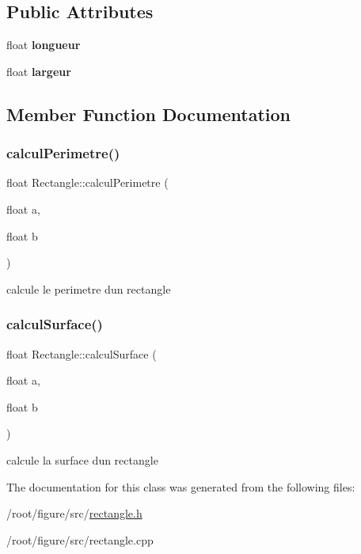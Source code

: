 \subsection*{Public Attributes}
\begin{DoxyCompactItemize}
\item 
\mbox{\label{classRectangle_aea28f8e235d7d8c79dc53d5436c0bc85}} 
float {\bfseries longueur}
\item 
\mbox{\label{classRectangle_a66e10016113076e07fa361871b82d819}} 
float {\bfseries largeur}
\end{DoxyCompactItemize}


\subsection{Member Function Documentation}
\mbox{\label{classRectangle_aa90f2be32fb070a870405842ec55c1be}} 
\subsubsection{\texorpdfstring{calcul\+Perimetre()}{calculPerimetre()}}
{\footnotesize\ttfamily float Rectangle\+::calcul\+Perimetre (\begin{DoxyParamCaption}\item[{float}]{a,  }\item[{float}]{b }\end{DoxyParamCaption})}

calcule le perimetre d\textquotesingle{}un rectangle \mbox{\label{classRectangle_a2931c93ead4aa6ac3e337de151dcd49c}} 
\subsubsection{\texorpdfstring{calcul\+Surface()}{calculSurface()}}
{\footnotesize\ttfamily float Rectangle\+::calcul\+Surface (\begin{DoxyParamCaption}\item[{float}]{a,  }\item[{float}]{b }\end{DoxyParamCaption})}

calcule la surface d\textquotesingle{}un rectangle 

The documentation for this class was generated from the following files\+:\begin{DoxyCompactItemize}
\item 
/root/figure/src/\hyperlink{rectangle_8h}{rectangle.\+h}\item 
/root/figure/src/rectangle.\+cpp\end{DoxyCompactItemize}
